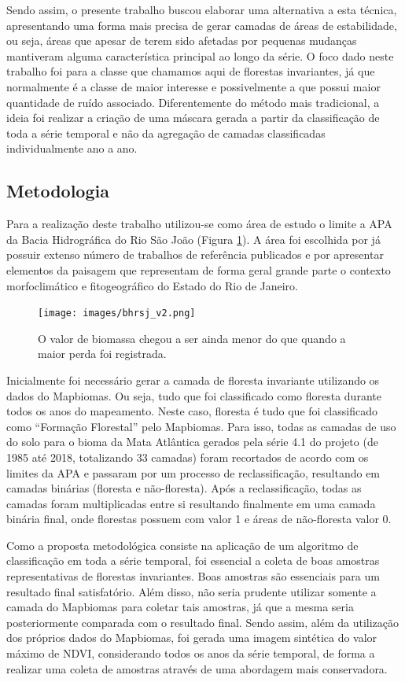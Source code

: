 \documentclass[12pt,a4paper]{article}
\begin{document}
Sendo assim, o presente trabalho buscou elaborar uma alternativa a esta técnica, apresentando uma forma mais precisa de gerar camadas de áreas de estabilidade, ou seja, áreas que apesar de terem sido afetadas por pequenas mudanças mantiveram alguma característica principal ao longo da série. O foco dado neste trabalho foi para a classe que chamamos aqui de florestas invariantes, já que normalmente é a classe de maior interesse e possivelmente a que possui maior quantidade de ruído associado. Diferentemente do método mais tradicional, a ideia foi realizar a criação de uma máscara gerada a partir da classificação de toda a série temporal e não da agregação de camadas classificadas individualmente ano a ano. 

\subsection{Metodologia}

Para a realização deste trabalho utilizou-se como área de estudo o limite a APA da Bacia Hidrográfica do Rio São João (Figura \ref{fig:bhrsj}). A área foi escolhida por já possuir extenso número de trabalhos de referência publicados e por apresentar elementos da paisagem que representam de forma geral grande parte o contexto morfoclimático e fitogeográfico do Estado do Rio de Janeiro.

\begin{figure}[h!]
    \centering
    \texttt{[image: images/bhrsj\_v2.png]}
    \caption{O valor de biomassa chegou a ser ainda menor do que quando a maior perda foi registrada.}
    \label{fig:bhrsj}
\end{figure}

Inicialmente foi necessário gerar a camada de floresta invariante utilizando os dados do Mapbiomas. Ou seja, tudo que foi classificado como floresta durante todos os anos do mapeamento. Neste caso, floresta é tudo que foi classificado como “Formação Florestal” pelo Mapbiomas. Para isso, todas as camadas de uso do solo para o bioma da Mata Atlântica gerados pela série 4.1 do projeto (de 1985 até 2018, totalizando 33 camadas) foram recortados de acordo com os limites da APA e passaram por um processo de reclassificação, resultando em camadas binárias (floresta e não-floresta). Após a reclassificação, todas as camadas foram multiplicadas entre si resultando finalmente em uma camada binária final, onde florestas possuem com valor 1 e áreas de não-floresta valor 0.

Como a proposta metodológica consiste na aplicação de um algoritmo de classificação em toda a série temporal, foi essencial a coleta de boas amostras representativas de florestas invariantes. Boas amostras são essenciais para um resultado final satisfatório. Além disso, não seria prudente utilizar somente a camada do Mapbiomas para coletar tais amostras, já que a mesma seria posteriormente comparada com o resultado final. Sendo assim, além da utilização dos próprios dados do Mapbiomas, foi gerada uma imagem sintética do valor máximo de NDVI, considerando todos os anos da série temporal, de forma a realizar uma coleta de amostras através de uma abordagem mais conservadora.
\end{document}
